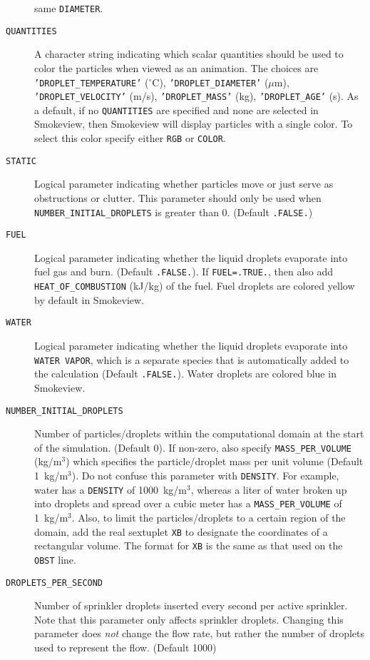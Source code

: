 \documentclass[11pt]{book}
\newcommand{\ct}{\tt\small}
\begin{document}
\begin{description}
same {\ct DIAMETER}.
\item[{\ct QUANTITIES}] A character string indicating which
scalar quantities should be used to color the particles when viewed as an
animation. The choices are {\ct 'DROPLET\_TEMPERATURE'} ($^\circ$C), {\ct 'DROPLET\_DIAMETER'} ($\mu$m),
{\ct 'DROPLET\_VELOCITY'} (m/s), {\ct 'DROPLET\_MASS'} (kg), {\ct 'DROPLET\_AGE'} (s).
As a default, if no {\ct QUANTITIES} are specified and none are selected in Smokeview, then
Smokeview will display particles with a single color.  To select this color specify either {\ct RGB} or
{\ct COLOR}.
\item[{\ct STATIC}] Logical parameter indicating whether particles move or just serve
as obstructions or clutter. This parameter should only be used when
{\ct NUMBER\_INITIAL\_DROPLETS} is greater than 0. (Default {\ct .FALSE.})
\item[{\ct FUEL}] Logical parameter indicating whether the liquid droplets evaporate
into fuel gas and burn. (Default {\ct .FALSE.}). If {\ct FUEL=.TRUE.},
then also add {\ct HEAT\_OF\_COMBUSTION} (kJ/kg) of the fuel. Fuel droplets are colored yellow by default in Smokeview.
\item[{\ct WATER}] Logical parameter indicating whether the liquid droplets evaporate
into {\ct WATER VAPOR}, which is a separate species that is automatically added to the calculation (Default {\ct .FALSE.}).
Water droplets are colored blue in Smokeview.
\item[{\ct NUMBER\_INITIAL\_DROPLETS}]
Number of particles/droplets within the computational domain at the start of the simulation.
(Default 0). If non-zero, also specify {\ct MASS\_PER\_VOLUME} (kg/m$^3$) which
specifies the particle/droplet mass per unit volume (Default 1~kg/m$^3$). Do
not confuse this parameter with {\ct DENSITY}. For example, water has a
{\ct DENSITY} of 1000~kg/m$^3$, whereas a liter of water broken up into droplets
and spread over a cubic meter has a {\ct MASS\_PER\_VOLUME} of 1~kg/m$^3$. Also, to limit the particles/droplets to a
certain region of the domain, add the real sextuplet {\ct XB} to designate the coordinates of a rectangular volume. The format
for {\ct XB} is the same as that used on the {\ct OBST} line.
\item[{\ct DROPLETS\_PER\_SECOND}]  Number of sprinkler droplets inserted every
second per active sprinkler. Note that this parameter only affects sprinkler
droplets. Changing this parameter does {\em not} change the flow rate, but rather the number
of droplets used to represent the flow. (Default 1000)
\end{description}
\end{document}
